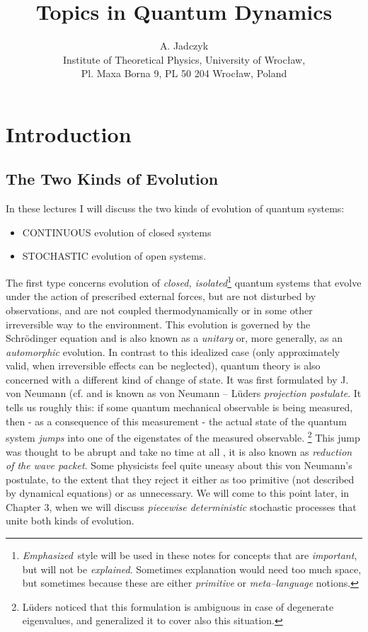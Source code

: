 \documentclass[12pt]{article}
\title{Topics in Quantum Dynamics}
\author{A.  Jadczyk \\
Institute of Theoretical Physics, 
 University of Wroc{\l }aw,  \\
Pl.  Maxa Borna 9,  PL 50 204 Wroc{\l }aw,  Poland} %
\begin{document}
\newtheorem{theorem}{Theorem}
\maketitle
\section{Introduction}
\subsection{The Two Kinds of Evolution}
In these lectures I will discuss the two kinds of evolution of
quantum systems:  \begin{itemize}
\item CONTINUOUS evolution of closed systems
\item STOCHASTIC evolution of open systems.  
\end{itemize}
The first type
concerns evolution of {\sl closed, 
isolated}\footnote{
{\sl Emphasized}\,  style will be  used in these notes
for  concepts that are {\sl
important},  but will not be {\sl explained}.  Sometimes explanation
would need too much space,  but sometimes because these are either {\sl
primitive} or {\sl meta--language} notions. } quantum systems that evolve
under the action of prescribed external forces,  but are not disturbed by
observations,  and are not coupled thermodynamically or in some other
irreversible way to the environment.  This evolution is governed by the
Schr\"odinger equation and is also known as a {\sl unitary} or,  more
generally,  as an {\sl automorphic} evolution.  In contrast to this idealized
case  (only approximately valid, when irreversible effects can be neglected),
quantum theory is also concerned with a different kind of change of state. 
It was first formulated by J.  von Neumann  (cf.  \cite[Ch.  V. 1]{neu} and is
known as von Neumann -- L\"uders {\sl projection postulate}.  It tells us
roughly this:  if some quantum mechanical observable is being measured,
then - as
a consequence of this measurement - the actual state of the quantum system 
{\sl jumps} into one of the eigenstates of the measured
observable. \footnote{L\"uders
\cite{lud} noticed that this formulation is ambiguous in case of
degenerate eigenvalues,  and generalized it to cover also this
situation. } This jump was thought to be abrupt and take no time at all
,  it is also known as {\sl
reduction of the wave packet}.  Some physicists feel quite uneasy about this
von Neumann's postulate,  to the extent that they reject it either as too
primitive  (not described by dynamical equations) or as unnecessary.  We will
come to this point later,  in Chapter 3,  when we will discuss {\sl piecewise 
deterministic}
stochastic processes that unite both kinds of evolution. 
\end{document}
